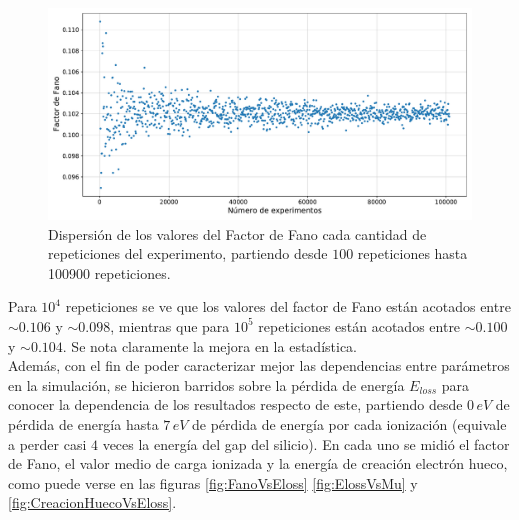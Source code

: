 \begin{figure}%
    \centering
    \includegraphics[scale=0.5]{Figs/FanoConvergencia.pdf}
    \caption{\footnotesize{Dispersión de los valores del Factor de Fano cada cantidad de repeticiones del experimento, partiendo desde $100$ repeticiones hasta 100900 repeticiones.}}
    \label{fig:FanoConvergencia}
\end{figure}
Para $10^{4}$ repeticiones se ve que los valores del factor de Fano están acotados entre $\sim 0.106$ y $\sim 0.098$, mientras que para $10^{5}$ repeticiones están acotados entre $\sim 0.100$ y $\sim 0.104$. Se nota claramente la mejora en la estadística.\\
\indent Además, con el fin de poder caracterizar mejor las dependencias entre parámetros en la simulación, se hicieron barridos sobre la pérdida de energía $E_{loss}$ para conocer la dependencia de los resultados respecto de este, partiendo desde $0\,\si{eV}$ de pérdida de energía hasta $7\,\si{eV}$ de pérdida de energía por cada ionización (equivale a perder casi $4$ veces la energía del gap del silicio). En cada uno se midió el factor de Fano, el valor medio de carga ionizada y la energía de creación electrón hueco, como puede verse en las figuras \ref{fig:FanoVsEloss} \ref{fig:ElossVsMu} y \ref{fig:CreacionHuecoVsEloss}. 
